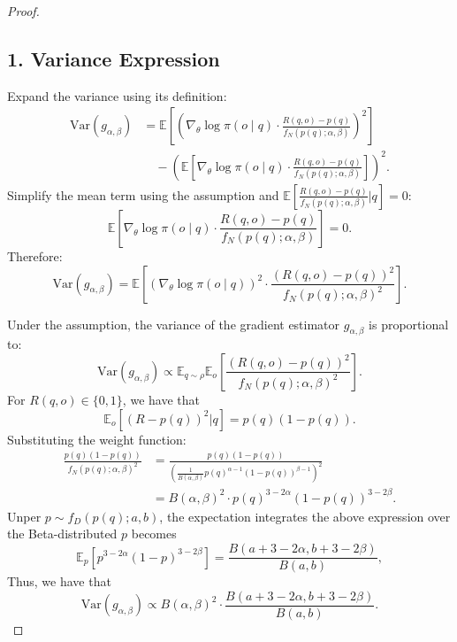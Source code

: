 \documentclass{article}
\theoremstyle{plain}
\theoremstyle{definition}
\theoremstyle{remark}
\begin{document}
\begin{proof}
\subsection*{1. Variance Expression}
Expand the variance using its definition:
\begin{align*}
    \mathrm{Var}(g_{\alpha,\beta}) &= \mathbb{E}\left[\left(\nabla_\theta \log \pi(o \mid q) \cdot \frac{R(q,o)-p(q)}{f_N(p(q);\alpha,\beta)}\right)^2\right] \nonumber \\
    &\quad - \left(\mathbb{E}\left[\nabla_\theta \log \pi(o \mid q) \cdot \frac{R(q,o)-p(q)}{f_N(p(q);\alpha,\beta)}\right]\right)^2.
\end{align*}
Simplify the mean term using the assumption and $\mathbb{E}[\frac{R(q,o)-p(q)}{f_N(p(q);\alpha,\beta)}|q]=0$:
\begin{equation*}
    \mathbb{E}\left[\nabla_\theta \log \pi(o \mid q) \cdot \frac{R(q,o)-p(q)}{f_N(p(q);\alpha,\beta)}\right] = 0.
\end{equation*}
Therefore:
\begin{equation*}
    \mathrm{Var}(g_{\alpha,\beta}) = \mathbb{E}\left[\left(\nabla_\theta \log \pi(o \mid q)\right)^2 \cdot \frac{(R(q,o)-p(q))^2}{f_N(p(q);\alpha,\beta)^2}\right].
\end{equation*}

Under the assumption, the variance of the gradient estimator \( g_{\alpha,\beta} \) is proportional to:
\begin{equation*}
    \mathrm{Var}(g_{\alpha,\beta}) \propto \mathbb{E}_{q \sim \rho} \mathbb{E}_o \left[ \frac{(R(q,o)-p(q))^2}{f_{N}(p(q);\alpha,\beta)^2} \right].
\end{equation*}
For $R(q,o) \in \{0,1\}$, we have that
    \begin{equation*}
        \mathbb{E}_o \left[ (R - p(q))^2 | q \right] = p(q)(1 - p(q)).
    \end{equation*}
    Substituting the weight function:
    \begin{align*}
        \frac{p(q)(1 - p(q))}{f_{N}(p(q);\alpha,\beta)^2} &= \frac{p(q)(1 - p(q))}{\left(\frac{1}{B(\alpha,\beta)} p(q)^{\alpha-1}(1-p(q))^{\beta-1}\right)^2} \\
        &= B(\alpha,\beta)^2 \cdot p(q)^{3 - 2\alpha}(1-p(q))^{3 - 2\beta}.
    \end{align*}
Unper $p\sim f_{D}(p(q);a,b)$, the expectation integrates the above expression over the Beta-distributed $p$ becomes
\begin{equation*}
    \mathbb{E}_p \left[ p^{3 - 2\alpha}(1-p)^{3 - 2\beta} \right] = \frac{B(a + 3 - 2\alpha, b + 3 - 2\beta)}{B(a,b)},
\end{equation*}
Thus, we have that
\begin{equation*}
    \mathrm{Var}(g_{\alpha,\beta}) \propto B(\alpha,\beta)^2 \cdot \frac{B(a + 3 - 2\alpha, b + 3 - 2\beta)}{B(a,b)}.
\end{equation*}


\end{proof}
\end{document}
